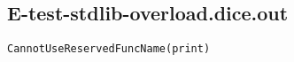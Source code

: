 \subsection{E-test-stdlib-overload.dice.out}
\begin{verbatim}
CannotUseReservedFuncName(print)

\end{verbatim}